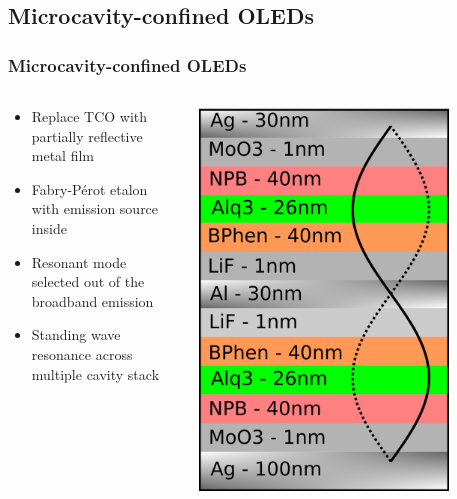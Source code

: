 \documentclass{beamer}
\begin{document}
    \subsection{Microcavity-confined OLEDs}
        \begin{frame}
            \frametitle{Microcavity-confined OLEDs}
            \begin{columns}
				\begin{column}{0.5\textwidth}
					\begin{itemize}
						\item Replace TCO with partially reflective metal film
						\vspace{0.5cm}
						\item Fabry-P\'erot etalon with emission source inside
						\vspace{0.5cm}
						\item Resonant mode selected out of the broadband emission
						\vspace{0.5cm}
						\item Standing wave resonance across multiple cavity stack
					\end{itemize}

				\end{column}
				\begin{column}{0.5\textwidth}
					\centering
					\includegraphics[width=0.8\textwidth]{images/schematic.png}
				\end{column}
            \end{columns}

        \end{frame}
        
\end{document}
